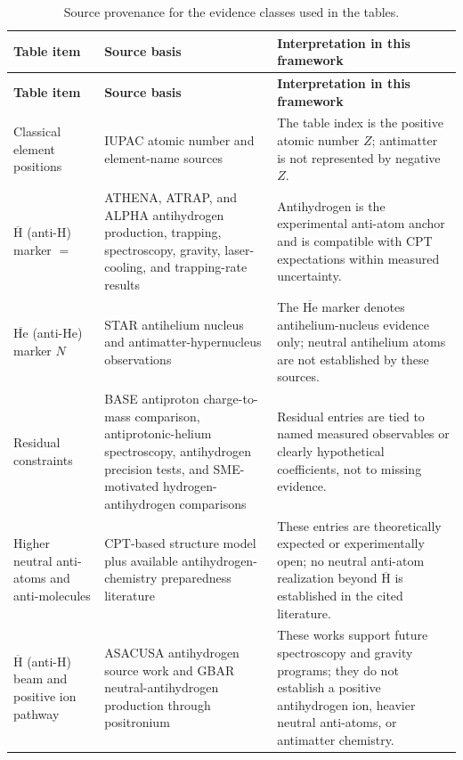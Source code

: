 \documentclass[11pt,a4paper]{article}
\newcommand{\antiH}{\ensuremath{\overline{\mathrm{H}}}}
\newcommand{\antiHe}{\ensuremath{\overline{\mathrm{He}}}}
\begin{document}
\begin{longtable}{L{0.23\textwidth}L{0.30\textwidth}L{0.35\textwidth}}
\caption{Source provenance for the evidence classes used in the tables.}\label{tab:source-provenance}\\
\toprule
\textbf{Table item} & \textbf{Source basis} & \textbf{Interpretation in this framework}\\
\midrule
\endfirsthead
\toprule
\textbf{Table item} & \textbf{Source basis} & \textbf{Interpretation in this framework}\\
\midrule
\endhead
Classical element positions & IUPAC atomic number and element-name sources \cite{IUPACatomicnumber,IUPAC113118} & The table index is the positive atomic number $Z$; antimatter is not represented by negative $Z$.\\
\antiH{} (anti-H) marker $=$ & ATHENA, ATRAP, and ALPHA antihydrogen production, trapping, spectroscopy, gravity, laser-cooling, and trapping-rate results \cite{ATHENA2002,ATRAP2002,Andresen2010,Andresen2011,ALPHA2017,Ahmadi2017Hyperfine,ALPHA2018,ALPHA2018Lyman,ALPHA2020Fine,Baker2021Cooling,ALPHA2025Hyperfine,Anderson2023,Akbari2025} & Antihydrogen is the experimental anti-atom anchor and is compatible with CPT expectations within measured uncertainty.\\
\antiHe{} (anti-He) marker $N$ & STAR antihelium nucleus and antimatter-hypernucleus observations \cite{STAR2011,STAR2024} & The \antiHe{} marker denotes antihelium-nucleus evidence only; neutral antihelium atoms are not established by these sources.\\
Residual constraints & BASE antiproton charge-to-mass comparison, antiprotonic-helium spectroscopy, antihydrogen precision tests, and SME-motivated hydrogen-antihydrogen comparisons \cite{Borchert2022,Hori2011,ALPHA2018,Bluhm1999,KosteleckyVargas2015} & Residual entries are tied to named measured observables or clearly hypothetical coefficients, not to missing evidence.\\
Higher neutral anti-atoms and anti-molecules & CPT-based structure model plus available antihydrogen-chemistry preparedness literature \cite{Zammit2019,Zammit2025} & These entries are theoretically expected or experimentally open; no neutral anti-atom realization beyond \antiH{} is established in the cited literature.\\
\antiH{} (anti-H) beam and positive ion pathway & ASACUSA antihydrogen source work and GBAR neutral-antihydrogen production through positronium \cite{Kuroda2014,GBAR2023} & These works support future spectroscopy and gravity programs; they do not establish a positive antihydrogen ion, heavier neutral anti-atoms, or antimatter chemistry.\\
\bottomrule
\end{longtable}
\end{document}
